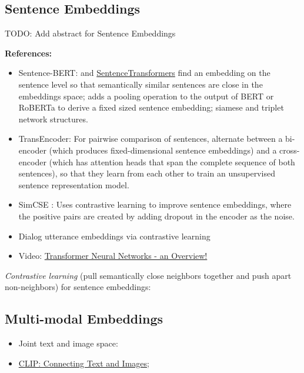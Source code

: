 \documentclass[11pt, a4paper]{amsart}
\begin{document}
\subsection{Sentence Embeddings}

TODO: Add abstract for Sentence Embeddings


\noindent \textbf{References:}
\begin{itemize}
	\item Sentence-BERT: \cite{DBLP:journals/corr/abs-1908-10084} and \href{https://www.sbert.net/}{SentenceTransformers}
	find an embedding on the sentence level so that semantically similar sentences are close in the embeddings space;
	adds a pooling operation to the output of BERT or RoBERTa to derive a fixed sized sentence embedding;
	siamese and triplet network structures.
	\item TransEncoder: For pairwise comparison of sentences, \cite{DBLP:journals/corr/abs-2109-13059} alternate between a bi-encoder (which produces fixed-dimensional sentence embeddings) and a cross-encoder (which has attention heads that span the complete sequence of both sentences), so that they learn from each other to train an unsupervised sentence representation model.
	\item SimCSE \cite{DBLP:journals/corr/abs-2104-08821}: Uses contrastive learning to improve sentence embeddings, where the positive pairs are created by adding dropout in the encoder as the noise.
	\item Dialog utterance embeddings via contrastive learning \cite{https://doi.org/10.48550/arxiv.2205.13568}
	\item Video: \href{https://youtu.be/O3xbVmpdJwU}{Transformer Neural Networks - an Overview!}
\end{itemize}

{
	\color{blue}
	
	\emph{Contrastive learning} (pull semantically close neighbors together and push apart non-neighbors) for sentence embeddings:
} %


\subsection{Multi-modal Embeddings}

\begin{itemize}
	\item Joint text and image space:
	\cite{DBLP:journals/corr/abs-2111-07180}
	
	\item \href{https://openai.com/blog/clip/}{CLIP: Connecting Text and Images};
	\cite{radford2021learning}
\end{itemize}
\end{document}
